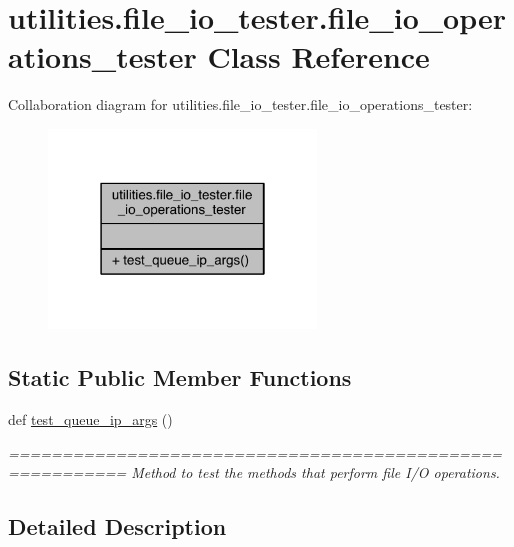 \hypertarget{classutilities_1_1file__io__tester_1_1file__io__operations__tester}{}\section{utilities.\+file\+\_\+io\+\_\+tester.\+file\+\_\+io\+\_\+operations\+\_\+tester Class Reference}
\label{classutilities_1_1file__io__tester_1_1file__io__operations__tester}


Collaboration diagram for utilities.\+file\+\_\+io\+\_\+tester.\+file\+\_\+io\+\_\+operations\+\_\+tester\+:
\nopagebreak
\begin{figure}[H]
\begin{center}
\leavevmode
\includegraphics[width=202pt]{d8/dec/classutilities_1_1file__io__tester_1_1file__io__operations__tester__coll__graph}
\end{center}
\end{figure}
\subsection*{Static Public Member Functions}
\begin{DoxyCompactItemize}
\item 
def \hyperlink{classutilities_1_1file__io__tester_1_1file__io__operations__tester_aeb92655105777047c5da87ac2fe33451}{test\+\_\+queue\+\_\+ip\+\_\+args} ()
\begin{DoxyCompactList}\small\item\em ========================================================= Method to test the methods that perform file I/\+O operations. \end{DoxyCompactList}\end{DoxyCompactItemize}


\subsection{Detailed Description}


